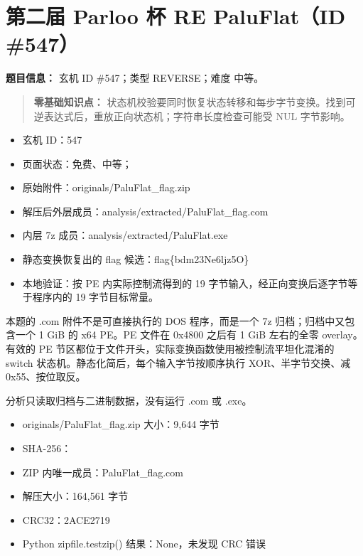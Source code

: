 \section{第二届 Parloo 杯 RE PaluFlat（ID \#547）}\label{ux7b2cux4e8cux5c4a-parloo-ux676f-re-paluflatid-547}

\textbf{题目信息：} 玄机 ID \#547；类型 REVERSE；难度 中等。

\begin{quote}
\textbf{零基础知识点：} 状态机校验要同时恢复状态转移和每步字节变换。找到可逆表达式后，重放正向状态机；字符串长度检查可能受 NUL 字节影响。
\end{quote}

\begin{itemize}
\tightlist
\item
  玄机 ID：547
\item
  页面状态：免费、中等；
\item
  原始附件：originals/PaluFlat\_flag.zip
\item
  解压后外层成员：analysis/extracted/PaluFlat\_flag.com
\item
  内层 7z 成员：analysis/extracted/PaluFlat.exe
\item
  静态变换恢复出的 flag 候选：flag\{bdm23Ne6ljz5O\}
\item
  本地验证：按 PE 内实际控制流得到的 19 字节输入，经正向变换后逐字节等于程序内的 19 字节目标常量。
\end{itemize}

本题的 .com 附件不是可直接执行的 DOS 程序，而是一个 7z 归档；归档中又包含一个 1 GiB 的 x64 PE。PE 文件在 0x4800 之后有 1 GiB 左右的全零 overlay。有效的 PE 节区都位于文件开头，实际变换函数使用被控制流平坦化混淆的 switch 状态机。静态化简后，每个输入字节按顺序执行 XOR、半字节交换、减 0x55、按位取反。

分析只读取归档与二进制数据，没有运行 .com 或 .exe。

\begin{itemize}
\tightlist
\item
  originals/PaluFlat\_flag.zip 大小：9,644 字节
\item
  SHA-256：
\item
  ZIP 内唯一成员：PaluFlat\_flag.com
\item
  解压大小：164,561 字节
\item
  CRC32：2ACE2719
\item
  Python zipfile.testzip() 结果：None，未发现 CRC 错误
\end{itemize}


